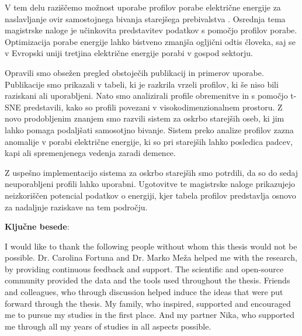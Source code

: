 \documentclass[
11pt, %
english, %
singlespacing, %
headsepline, %
]{MastersDoctoralThesis} %
\begin{document}
\begin{sloabstract}
  \addchaptertocentry{\sloabstractname} %
V tem delu raziščemo možnost uporabe profilov porabe električne energije za naslavljanje ovir samostojnega bivanja starejšega prebivalstva . 
Osrednja tema magistrske naloge je učinkovita predstavitev podatkov s pomočjo profilov porabe.
Optimizacija porabe energije lahko bistveno zmanjša ogljični odtis človeka, saj se v Evropski uniji tretjina električne energije porabi v gospod sektorju.

Opravili smo obsežen pregled obstoječih publikacij in primerov uporabe.
Publikacije smo prikazali v tabeli, ki je razkrila vrzeli profilov, ki še niso bili raziskani ali uporabljeni.
Nato smo analizirali profile obremenitve in s pomočjo t-SNE predstavili, kako so profili povezani v visokodimenzionalnem prostoru. 
Z novo prodobljenim znanjem smo razvili sistem za oskrbo starejših oseb, ki jim lahko pomaga podaljšati samosotjno bivanje.
Sistem preko analize profilov zazna anomalije v porabi električne energije, ki so pri starejših lahko posledica padcev, kapi ali spremenjenega vedenja zaradi demence.

Z uspešno implementacijo sistema za oskrbo starejših smo potrdili, da so do sedaj neuporabljeni profili lahko uporabni.
Ugotovitve te magistrske naloge prikazujejo neizkoriščen potencial podatkov o energiji, kjer tabela profilov predstavlja osnovo za nadaljnje raziskave na tem področju.
  

  \par\textbf{Ključne besede}: \slokeywordnames 

\end{sloabstract}


\begin{acknowledgements}
\addchaptertocentry{\acknowledgementname} %
I would like to thank the following people without whom this thesis would not be possible.
Dr. Carolina Fortuna and Dr. Marko Meža helped me with the research, by providing continuous feedback and support.
The scientific and open-source community provided the data and the tools used throughout the thesis.
Friends and colleagues, who through discussion helped induce the ideas that were put forward through the thesis. 
My family, who inspired, supported and encouraged me to pursue my studies in the first place.
And my partner Nika, who supported me through all my years of studies in all aspects possible.

\end{acknowledgements}
\end{document}
